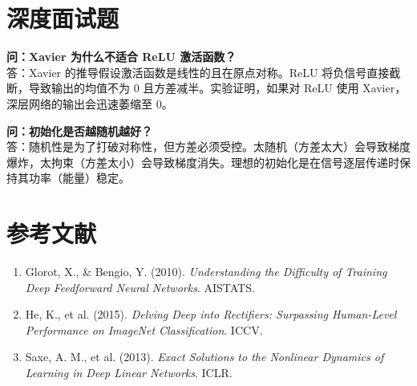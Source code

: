 \documentclass[12pt, a4paper]{article}
\begin{document}
\section{深度面试题}

\textbf{问：Xavier 为什么不适合 ReLU 激活函数？}\\
答：Xavier 的推导假设激活函数是线性的且在原点对称。ReLU 将负信号直接截断，导致输出的均值不为 0 且方差减半。实验证明，如果对 ReLU 使用 Xavier，深层网络的输出会迅速萎缩至 0。

\textbf{问：初始化是否越随机越好？}\\
答：随机性是为了打破对称性，但方差必须受控。太随机（方差太大）会导致梯度爆炸，太拘束（方差太小）会导致梯度消失。理想的初始化是在信号逐层传递时保持其功率（能量）稳定。

\section{参考文献}
\begin{enumerate}
    \item Glorot, X., \& Bengio, Y. (2010). \textit{Understanding the Difficulty of Training Deep Feedforward Neural Networks}. AISTATS.
    \item He, K., et al. (2015). \textit{Delving Deep into Rectifiers: Surpassing Human-Level Performance on ImageNet Classification}. ICCV.
    \item Saxe, A. M., et al. (2013). \textit{Exact Solutions to the Nonlinear Dynamics of Learning in Deep Linear Networks}. ICLR.
\end{enumerate}
\end{document}
